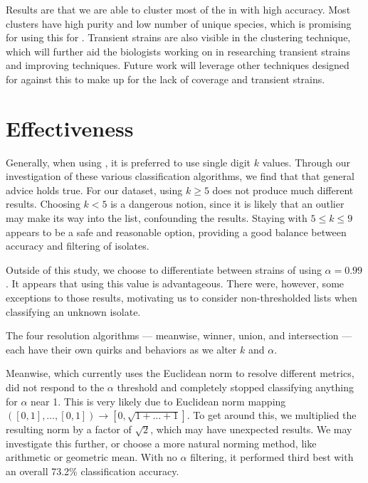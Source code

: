 Results are that we are able to cluster most of the \isols{} in \cplop{} with high accuracy. 
Most clusters have high purity and low number of unique species, which is promising for using this for \mst{}.
Transient strains are also visible in the clustering technique, which will further aid the biologists working on \cplop{} in researching transient strains and improving \mst{} techniques. 
Future work will leverage other \mst{} techniques designed for \cplop{} against this to make up for the lack of coverage and transient strains.
\section{\krap{} Effectiveness}
Generally, when using \kNN{}, it is preferred to use single digit $k$ values. Through our investigation of these various \kNN{} classification algorithms, we find that that general advice holds true. For our dataset, using $k\geq5$ does not produce much different results. Choosing $k<5$ is a dangerous notion, since it is likely that an outlier may make its way into the \knn{} list, confounding the results. Staying with $5\leq k\leq9$ appears to be a safe and reasonable option, providing a good balance between accuracy and filtering of isolates.

Outside of this study, we choose to differentiate between strains of \ecoli{} using $\alpha=0.99$. It appears that using this value is advantageous. There were, however, some exceptions to those results, motivating us to consider non-thresholded \knn{} lists when classifying an unknown isolate.

The four resolution algorithms --- meanwise, winner, union, and intersection --- each have their own quirks and behaviors as we alter $k$ and $\alpha$. 

Meanwise, which currently uses the Euclidean norm to resolve different metrics, did not respond to the $\alpha$ threshold and completely stopped classifying anything for $\alpha$ near 1. This is very likely due to Euclidean norm mapping $([0,1],\dots,[0,1])\rightarrow [0,\sqrt{1+\dots+1}]$. To get around this, we multiplied the resulting norm by a factor of $\sqrt2$, which may have unexpected results. We may investigate this further, or choose a more natural norming method, like arithmetic or geometric mean. With no $\alpha$ filtering, it performed third best with an overall 73.2\% classification accuracy.

